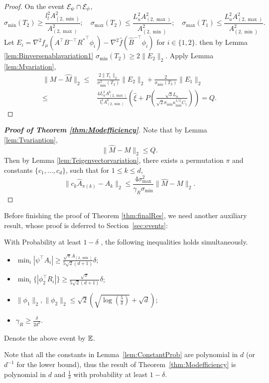 \begin{proof}
On the event $\mathcal{E}_{\psi}\cap\mathcal{E}_{\phi}$,
\[
\sigma_{\min}(T_2) \ge \frac{l_l^2A^2_{(2,\min)}}{A^2_{(2,\max)}}; \quad \sigma_{\max}(T_2) \le \frac{L_u^2A^2_{(2,\max)}}{A^2_{(2,\min)}};  \quad \sigma_{\max}(T_1) \le \frac{L_u^2A^2_{(2,\max)}}{A^2_{(2,\min)}}. 
\]
Let $E_i = \nabla^2 f_{\mu}(A^{\top}B^{-\top}{R^*}^{\top}\phi_i) - \nabla^2 \hat{f}(\hat{B}^{-\top}\phi_i)$ for  $i\in\{1,2\}$. then by 
Lemma \ref{lem:Binversenablavariation1} $\sigma_{\min}(T_2) \ge 2\|E_2\|_2$.
Apply Lemma \ref{lem:Mvariation},
\begin{align*}
\|M - \hat{M}\|_2 \le &
\frac{2\|T_1\|_2}{\sigma^2_{\min}(T_2)}\|E_2\|_2 + \frac{2}{\sigma_{\min}(T_2)}\|E_1\|_2 \\
\le & \frac{4L_u^2A^6_{(2,\max)}}{l_l^4 A^6_{(2,\min)}}\left(\hat{\xi}
+
P\left(\frac{\sqrt{3}L_u}{\sqrt{2}\sigma_{\min}\kappa_{\min}^{1/2}C_1}\right)\right) = Q.
\end{align*}
\end{proof}
\begin{proof}[{\bf Proof of Theorem \ref{thm:Modefficiency}}]
Note that by Lemma \ref{lem:Tvariantion},
\[
\|\hat{M} - M\|_2 \le Q.
\]
Then by Lemma \ref{lem:Teigenvectorvariation}, there exists a permutation $\pi$ and constants $\{c_1,\ldots,c_d\}$, such that for $1\le k\le d$,
\[
\| c_k\hat{A}_{\pi(k)} - A_k\|_2 \le \frac{4\sigma^2_{\max}}{\gamma_R\sigma_{\min}} \|\hat{M} - M\|_2.
\]
\end{proof}

Before finishing the proof of Theorem \ref{thm:finalRes}, we need another auxiliary result, whose proof is deferred to Section~\ref{sec:events}:
\begin{lemma}
\label{lem:ConstantProb}
With Probability at least $1-\delta$ , the following inequalities holds simultaneously.
\begin{itemize}
\vspace{-3mm}
\item $\min_i |\psi^{\top}A_i| \ge \frac{\sqrt{\pi}A_{(2,\min)}}{5\sqrt{2}(d+1)} \delta$;
\item $\min_i \{|\phi_2^{\top}R_i|\} \ge \frac{\sqrt{\pi}}{5\sqrt{2}(d+1)}\delta$;
\item $\|\phi_1\|_2, \|\phi_2\|_2 \le \sqrt{2}\left(\sqrt{\log(\frac{5}{\delta})}+\sqrt{d}\right)$;
\item $\gamma_R \ge\frac{\delta}{2d^2}$.
\end{itemize}
\vspace{-2mm}
\end{lemma}
Denote the above event by $\mathbb{E}$.
\begin{remark}
Note that all the constants in Lemma~\ref{lem:ConstantProb} are polynomial in $d$ (or $d^{-1}$ for the lower bound), thus the result of Theorem~\ref{thm:Modefficiency} is polynomial in $d$ and $\frac{1}{\delta}$ with probability at least $1-\delta$. %
\end{remark}

